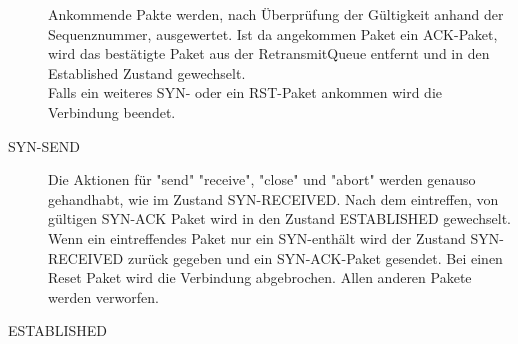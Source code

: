 \begin{description}
Ankommende Pakte werden, nach Überprüfung der Gültigkeit anhand der Sequenznummer, ausgewertet. Ist da angekommen Paket ein ACK-Paket, wird das bestätigte Paket aus der RetransmitQueue entfernt und in den Established Zustand gewechselt. \\ Falls ein weiteres SYN- oder ein RST-Paket ankommen wird die Verbindung beendet. 

	
\item[SYN-SEND]
Die Aktionen für "{}send"{} {}"receive"{}, {}"close"{} und "{}abort"{} werden genauso gehandhabt, wie im Zustand SYN-RECEIVED.
Nach dem eintreffen, von gültigen SYN-ACK Paket wird in den Zustand ESTABLISHED gewechselt. Wenn ein eintreffendes Paket nur ein SYN-enthält wird der Zustand SYN-RECEIVED zurück gegeben und ein SYN-ACK-Paket gesendet. Bei einen Reset Paket wird die Verbindung abgebrochen. Allen anderen Pakete werden verworfen.   
	
\item[ESTABLISHED]


\end{description}

